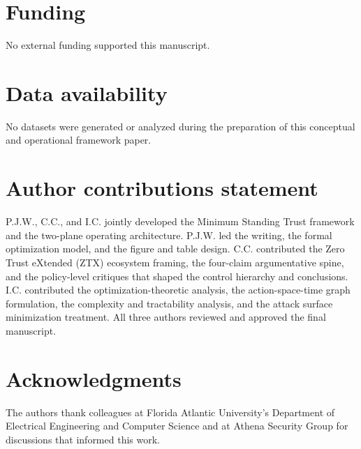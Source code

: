 \documentclass[unnumsec,webpdf,contemporary,large]{oup-authoring-template}
\theoremstyle{thmstyleone}
\theoremstyle{thmstyletwo}
\theoremstyle{thmstylethree}
\begin{document}
\section{Funding}
No external funding supported this manuscript.

\section{Data availability}
No datasets were generated or analyzed during the preparation of this conceptual and operational framework paper.

\section{Author contributions statement}
P.J.W., C.C., and I.C. jointly developed the Minimum Standing Trust framework and the two-plane operating architecture. P.J.W. led the writing, the formal optimization model, and the figure and table design. C.C. contributed the Zero Trust eXtended (ZTX) ecosystem framing, the four-claim argumentative spine, and the policy-level critiques that shaped the control hierarchy and conclusions. I.C. contributed the optimization-theoretic analysis, the action-space-time graph formulation, the complexity and tractability analysis, and the attack surface minimization treatment. All three authors reviewed and approved the final manuscript.

\section{Acknowledgments}
The authors thank colleagues at Florida Atlantic University's Department of Electrical Engineering and Computer Science and at Athena Security Group for discussions that informed this work.
\end{document}
